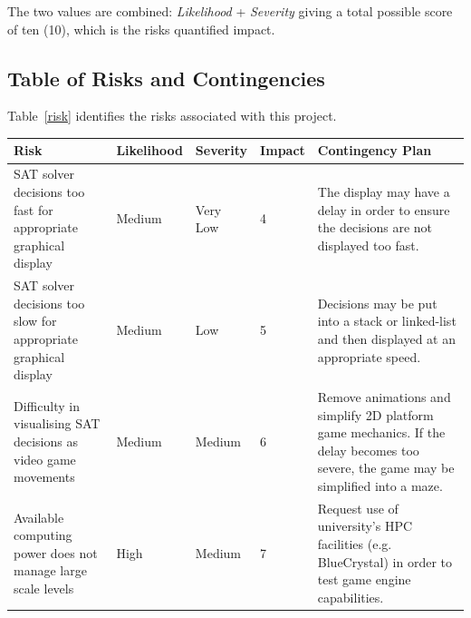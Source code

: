 \documentclass[a4paper]{article}
\begin{document}
\noindent The two values are combined: \textit{Likelihood} + \textit{Severity} giving a total possible
score of ten (10), which is the risks quantified impact.
\subsection{Table of Risks and Contingencies}

Table~\ref{risk} identifies the risks associated with this project. 

\begin{center}
    \begin{tabular}{ | p{4.2cm} | l | p{2.1cm} | p{1.1cm} | p{5cm} |}
    \hline
    \rowcolor{Gray}
    Risk & Likelihood & Severity & Impact & Contingency Plan \\ \hline



    SAT solver decisions too fast for appropriate graphical display & Medium & Very Low & 4 &
    The display may have a delay in order to ensure the decisions are not displayed too fast. \\ \hline

    SAT solver decisions too slow for appropriate graphical display & Medium & Low & 5 &
    Decisions may be put into a stack or linked-list and then displayed at an appropriate speed. \\ \hline

    Difficulty in visualising SAT decisions as video game movements & Medium & Medium & 6 & Remove
    animations and simplify 2D platform game mechanics. If the delay becomes too severe, the game may
    be simplified into a maze. \\ \hline

Available computing power does not manage large scale levels & High & Medium & 7 & Request use
of university's HPC facilities (e.g. BlueCrystal) in order to test game engine capabilities. \\
\hline


\end{tabular}
\end{center}
\end{document}
